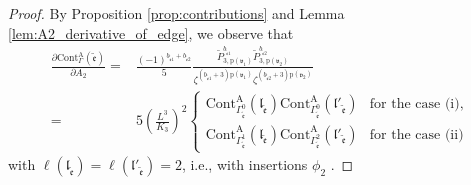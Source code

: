 \documentclass[10pt,a4paper]{amsart}
\begin{document}
\begin{proof}
By Proposition \ref{prop:contributions} and Lemma \ref{lem:A2_derivative_of_edge}, we observe that
\begin{equation*}
\begin{aligned}
\frac{\partial \mathrm{Cont}_{\Gamma}^{\mathrm{A}}(\tilde{\mathfrak{e}}) }{\partial A_2}
=&\frac{(-1)^{b_{\tilde{\mathfrak{e}}1}+b_{\tilde{\mathfrak{e}}2}}}{5} \frac{\widetilde{P}_{3,\mathrm{p}(\mathfrak{v}_1)}^{b_{\tilde{\mathfrak{e}}1}}\widetilde{P}_{3,\mathrm{p}(\mathfrak{v}_2)}^{b_{\tilde{\mathfrak{e}}2}}}{\zeta^{(b_{\tilde{\mathfrak{e}}1}+3)\mathrm{p}(\mathfrak{v}_1)}\zeta^{(b_{\tilde{\mathfrak{e}}2}+3)\mathrm{p}(\mathfrak{v}_2)}}\\
=&5\left(\frac{L^{3}}{K_{3}}\right)^2
\begin{cases}
\mathrm{Cont}_{\Gamma_{\tilde{\mathfrak{e}}}^0}^{\mathrm{A}}(\mathfrak{l}_{\tilde{\mathfrak{e}}})\mathrm{Cont}_{\Gamma_{\tilde{\mathfrak{e}}}^0}^{\mathrm{A}}(\mathfrak{l}'_{\tilde{\mathfrak{e}}})&\text{for the case (i)},\\
\mathrm{Cont}_{\Gamma_{\tilde{\mathfrak{e}}}^1}^{\mathrm{A}}(\mathfrak{l}_{\tilde{\mathfrak{e}}})\mathrm{Cont}_{\Gamma_{\tilde{\mathfrak{e}}}^2}^{\mathrm{A}}(\mathfrak{l}'_{\tilde{\mathfrak{e}}})&\text{for the case (ii)}
\end{cases}
\end{aligned}
\end{equation*}
with $\ell(\mathfrak{l}_{\tilde{\mathfrak{e}}})=\ell(\mathfrak{l}'_{\tilde{\mathfrak{e}}})=2$, i.e., with insertions $\phi_2$
.


\end{proof}
\end{document}
